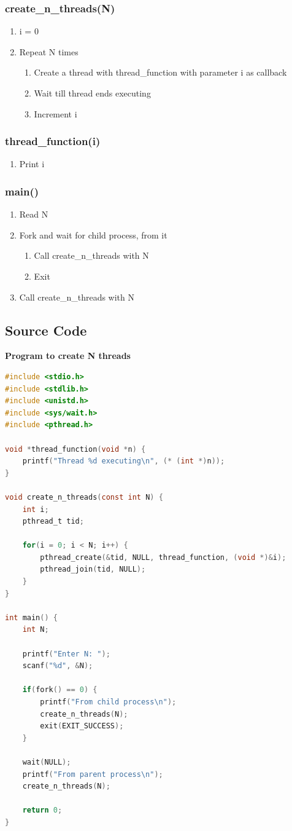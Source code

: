 \subsubsection*{create\_n\_threads(N)}
\begin{enumerate}
	\item i = 0
	\item Repeat N times
	\begin{enumerate}
		\item Create a thread with thread\_function with parameter i as callback
		\item Wait till thread ends executing
		\item Increment i
	\end{enumerate}
\end{enumerate}

\subsubsection*{thread\_function(i)}
\begin{enumerate}
	\item Print i
\end{enumerate}

\subsubsection*{main()}
\begin{enumerate}
	\item Read N
	\item Fork and wait for child process, from it
	\begin{enumerate}
		\item Call create\_n\_threads with N
		\item Exit
	\end{enumerate}
	\item Call create\_n\_threads with N
\end{enumerate}

\subsection{Source Code}
\textbf{Program to create N threads}
\begin{lstlisting}[language=C]
#include <stdio.h>
#include <stdlib.h>
#include <unistd.h>
#include <sys/wait.h>
#include <pthread.h>

void *thread_function(void *n) {
	printf("Thread %d executing\n", (* (int *)n));
}

void create_n_threads(const int N) {
	int i;
	pthread_t tid;

	for(i = 0; i < N; i++) {
		pthread_create(&tid, NULL, thread_function, (void *)&i);
		pthread_join(tid, NULL);
	}
}

int main() {
	int N;

	printf("Enter N: ");
	scanf("%d", &N);

	if(fork() == 0) {
		printf("From child process\n");
		create_n_threads(N);
		exit(EXIT_SUCCESS);
	}

	wait(NULL);
	printf("From parent process\n");
	create_n_threads(N);

	return 0;
}
\end{lstlisting}

